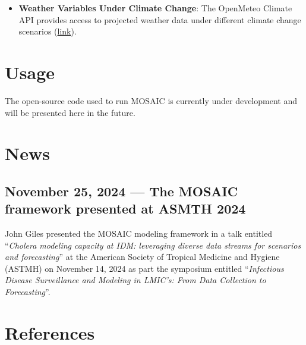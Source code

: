 \documentclass[
]{book}
\providecommand{\tightlist}{%
  \setlength{\itemsep}{0pt}\setlength{\parskip}{0pt}}
\begin{document}
\begin{itemize}
\tightlist
\item
  \textbf{Weather Variables Under Climate Change}: The OpenMeteo Climate API provides access to projected weather data under different climate change scenarios (\href{https://open-meteo.com/en/docs/climate-api}{link}).
\end{itemize}

\chapter{Usage}\label{usage}

The open-source code used to run MOSAIC is currently under development and will be presented here in the future.

\chapter{News}\label{news}

\section*{November 25, 2024 --- The MOSAIC framework presented at ASMTH 2024}\label{november-25-2024-the-mosaic-framework-presented-at-asmth-2024}

John Giles presented the MOSAIC modeling framework in a talk entitled ``\emph{Cholera modeling capacity at IDM:
leveraging diverse data streams for scenarios and forecasting}'' at the American Society of Tropical Medicine and Hygiene (ASTMH) on November 14, 2024 as part the symposium entitled ``\emph{Infectious Disease Surveillance and Modeling in LMIC's: From Data Collection to Forecasting}''.

\chapter{References}\label{references-1}

  
\end{document}
